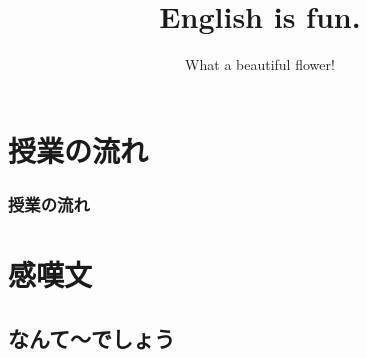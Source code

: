 \documentclass[aspectratio=169,xcolor={dvipsnames,table}]{beamer}
\title{English is fun.}
\subtitle{What a beautiful flower!}
\author{}
\institute[]{}
\date[]
\begin{document}
\begin{frame}[plain]
  \titlepage
\end{frame}

\section*{授業の流れ}
\begin{frame}[plain]
  \frametitle{授業の流れ}
  \tableofcontents
\end{frame}

\section{感嘆文}
\subsection{なんて～でしょう}
\end{document}
